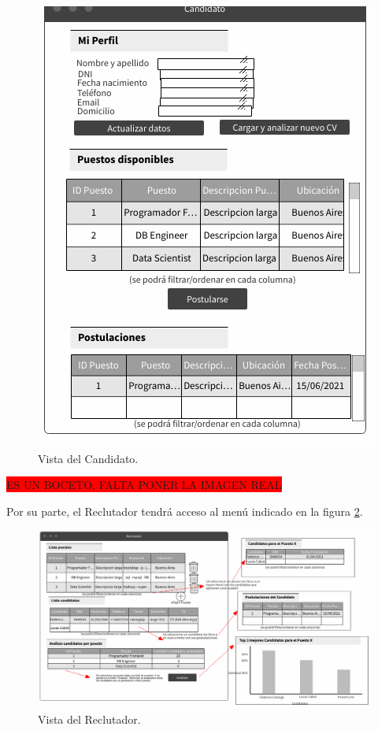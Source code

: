 \documentclass[12pt,a4paper]{article}
\begin{document}
\begin{sloppypar}
\begin{figure}[H]    %
  \centering
  \includegraphics[width=1\textwidth]{images/Vista_Candidato.png}
  \caption{Vista del Candidato.}  
  \label{fig:Vista_Candidato}
\end{figure}

\colorbox{red}{ES UN BOCETO, FALTA PONER LA IMAGEN REAL}

Por su parte, el Reclutador tendrá acceso al menú indicado en la figura \ref{fig:Vista_Reclutador}. 

\begin{figure}[H]    %
  \centering
  \includegraphics[width=1\textwidth]{images/Vista_Reclutador.png}
  \caption{Vista del Reclutador.}  
  \label{fig:Vista_Reclutador}
\end{figure}


\end{sloppypar}
\end{document}
